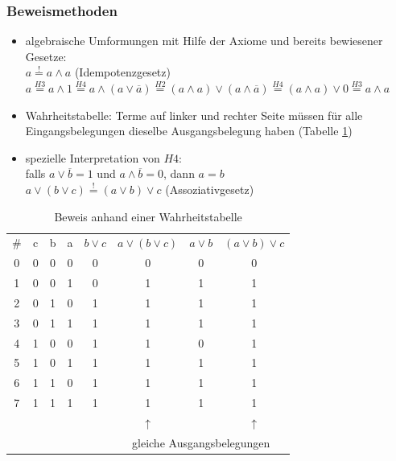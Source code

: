 \documentclass[10pt,a4paper]{scrartcl}
\begin{document}
\subsubsection{Beweismethoden}
\begin{itemize}
	\item algebraische Umformungen mit Hilfe der Axiome und bereits bewiesener Gesetze: \\
	$ a \overset{!}{=} a \wedge a $ (Idempotenzgesetz)\\
	$ a \overset{H3}{=} a \wedge 1 \overset{H4}{=} a \wedge ( a \vee \overline{a} ) \overset{H2}{=} (a \wedge a) \vee (a \wedge \overline{a}) \overset{H4}{=} (a \wedge a) \vee 0 \overset{H3}{=} a \wedge a$
	\item Wahrheitstabelle: Terme auf linker und rechter Seite müssen für alle Eingangsbelegungen dieselbe Ausgangsbelegung haben (Tabelle \ref{tab:beweiswhtbl})
	\item spezielle Interpretation von $H4$:\\
	falls $ a \vee \overline{b} = 1 $ und $ a \wedge \overline{b} = 0 $, dann $ a = b $\\
	$ a \vee (b \vee c) \overset{!}{=} (a \vee b) \vee c $ (Assoziativgesetz)
\end{itemize}

\begin{table}[h!]
	\centering
	\begin{tabular}{c|ccc|c|c|c|c}
	\# & c & b & a & $ b \vee c $ & $ a \vee (b \vee c) $ & $ a \vee b $ & $ (a \vee b) \vee c$\\
	0 & 0 & 0 & 0 & 0 & 0 & 0 & 0\\
	1 & 0 & 0 & 1 & 0 & 1 & 1 & 1\\
	2 & 0 & 1 & 0 & 1 & 1 & 1 & 1\\
	3 & 0 & 1 & 1 & 1 & 1 & 1 & 1\\
	4 & 1 & 0 & 0 & 1 & 1 & 0 & 1\\
	5 & 1 & 0 & 1 & 1 & 1 & 1 & 1\\
	6 & 1 & 1 & 0 & 1 & 1 & 1 & 1\\
	7 & 1 & 1 & 1 & 1 & 1 & 1 & 1\\
	 \multicolumn{5}{c}{}& \multicolumn{1}{c}{$\uparrow$}&\multicolumn{1}{c}{}& $\uparrow$\\
	 \multicolumn{5}{c}{}&\multicolumn{3}{c}{gleiche Ausgangsbelegungen}
\end{tabular}
\label{tab:beweiswhtbl}
\caption{Beweis anhand einer Wahrheitstabelle}
\end{table}
\end{document}
